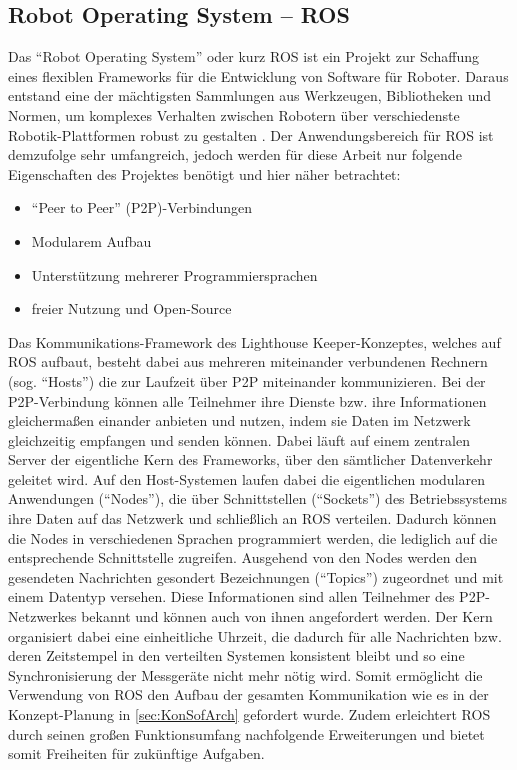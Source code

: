\subsection{Robot Operating System -- ROS}
Das "`Robot Operating System"' oder kurz ROS ist ein Projekt zur Schaffung eines flexiblen Frameworks für die Entwicklung von Software für Roboter. Daraus entstand eine der mächtigsten Sammlungen aus Werkzeugen, Bibliotheken und Normen, um komplexes Verhalten zwischen Robotern über verschiedenste Robotik-Plattformen robust zu gestalten \cite{ROSErkl}. Der Anwendungsbereich für ROS ist demzufolge sehr umfangreich, jedoch werden für diese Arbeit nur folgende Eigenschaften \cite{ROSPaper} des Projektes benötigt und hier näher betrachtet:
\begin{itemize}
\item "`Peer to Peer"' (P2P)-Verbindungen
\item Modularem Aufbau
\item Unterstützung mehrerer Programmiersprachen
\item freier Nutzung und Open-Source
\end{itemize}
Das Kommunikations-Framework des Lighthouse Keeper-Konzeptes, welches auf ROS aufbaut, besteht dabei aus mehreren miteinander verbundenen Rechnern (sog. "`Hosts"') die zur Laufzeit über P2P miteinander kommunizieren. Bei der P2P-Verbindung können alle Teilnehmer ihre Dienste bzw. ihre Informationen gleichermaßen einander anbieten und nutzen, indem sie Daten im Netzwerk gleichzeitig empfangen und senden können. Dabei läuft auf einem zentralen Server der eigentliche Kern des Frameworks, über den sämtlicher Datenverkehr geleitet wird. Auf den Host-Systemen laufen dabei die eigentlichen modularen Anwendungen ("`Nodes"'), die über Schnittstellen ("`Sockets"') des Betriebssystems ihre Daten auf das Netzwerk und schließlich an ROS verteilen. Dadurch können die Nodes in verschiedenen Sprachen programmiert werden, die lediglich auf die entsprechende Schnittstelle zugreifen. Ausgehend von den Nodes werden den gesendeten Nachrichten gesondert Bezeichnungen ("`Topics"') zugeordnet und mit einem Datentyp versehen. Diese Informationen sind allen Teilnehmer des P2P-Netzwerkes bekannt und können auch von ihnen angefordert werden. Der Kern organisiert dabei eine einheitliche Uhrzeit, die dadurch für alle Nachrichten bzw. deren Zeitstempel in den verteilten Systemen konsistent bleibt und so eine Synchronisierung der Messgeräte nicht mehr nötig wird. Somit ermöglicht die Verwendung von ROS den Aufbau der gesamten Kommunikation wie es in der Konzept-Planung in \ref{sec:KonSofArch} gefordert wurde. Zudem erleichtert ROS durch seinen großen Funktionsumfang nachfolgende Erweiterungen und bietet somit Freiheiten für zukünftige Aufgaben.
